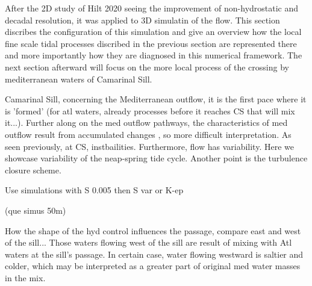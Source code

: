 











After the 2D study of Hilt 2020 seeing the improvement of non-hydrostatic and decadal resolution, it was applied to 3D simulatin of the flow. This section discribes the configuration of this simulation and give an overview how the local fine scale tidal processes discribed in the previous section are represented there and more importantly how they are diagnosed in this numerical framework. The next section afterward will focus on the more local process of the crossing by mediterranean waters of Camarinal Sill.

Camarinal Sill, concerning the Mediterranean outflow, it is the first pace where it is 'formed' (for atl waters, already processes before it reaches CS that will mix it...). Further along on the med outflow pathways, the characteristics of med outflow result from accumulated changes , so more difficult interpretation.  As seen previously, at CS, instbailities. Furthermore, flow has variability. Here we showcase variability of the neap-spring tide cycle. Another point is the turbulence closure scheme.

Use simulations with S 0.005 then S var or K-ep

(que simus 50m)



How the shape of the hyd control influences the passage, compare east and west of the sill... 
Those waters flowing west of the sill are result of mixing with Atl waters at the sill's passage.
In certain case, water flowing westward is saltier and colder, which may be interpreted as a greater part of original med water masses in the mix.




